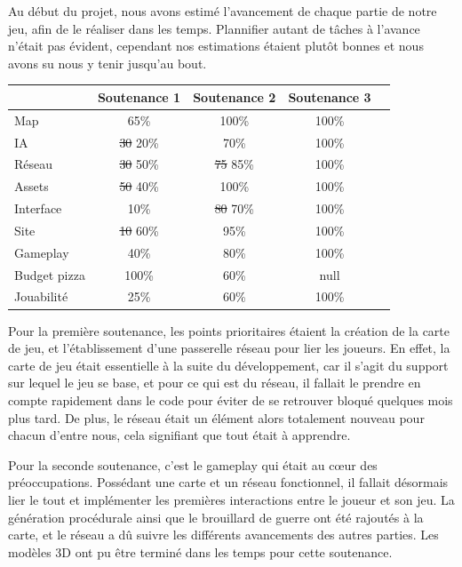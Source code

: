 \documentclass[12pt]{report}
\begin{document}
Au début du projet, nous avons estimé l'avancement de chaque partie de notre
jeu, afin de le réaliser dans les temps. Plannifier autant de tâches à l'avance
n'était pas évident, cependant nos estimations étaient plutôt bonnes et nous
avons su nous y tenir jusqu'au bout.

\vspace{0.5cm}

\begin{center}
    \begin{tabular}{@{} l *4c @{}}
        \toprule
        \multicolumn{1}{c}{}    & \textbf{Soutenance 1}  & \textbf{Soutenance 2}  & \textbf{Soutenance 3} \\ 
        \midrule
        Map & 65\% & 100\% & 100\% \\
        IA & \sout{30} {\color{red} 20}\% & 70\% & 100\% \\
        Réseau & \sout{30} {\color{green} 50}\% & \sout{75} {\color{green} 85}\% & 100\% \\
        Assets & \sout{50} {\color{red} 40}\% & 100\% & 100\% \\
        Interface & 10\% & \sout{80} {\color{red} 70}\% & 100\% \\
        Site & \sout{10} {\color{green} 60}\% & 95\% & 100\% \\
        Gameplay & 40\% & 80\% & 100\% \\
        Budget pizza & 100\% & 60\% & null\\
        \midrule
        Jouabilité & 25\% & 60\% & 100\% \\
        \bottomrule
    \end{tabular}
\end{center}

\vspace{0.5cm}

Pour la première soutenance, les points prioritaires étaient la création de la
carte de jeu, et l'établissement d'une passerelle réseau pour lier les joueurs.
En effet, la carte de jeu était essentielle à la suite du développement, car il
s'agit du support sur lequel le jeu se base, et pour ce qui est du réseau, il
fallait le prendre en compte rapidement dans le code pour éviter de se retrouver
bloqué quelques mois plus tard. De plus, le réseau était un élément alors
totalement nouveau pour chacun d'entre nous, cela signifiant que tout était à
apprendre.

Pour la seconde soutenance, c'est le gameplay qui était au cœur des
préoccupations. Possédant une carte et un réseau fonctionnel, il fallait
désormais lier le tout et implémenter les premières interactions entre le joueur
et son jeu. La génération procédurale ainsi que le brouillard de guerre ont été
rajoutés à la carte, et le réseau a dû suivre les différents avancements des
autres parties. Les modèles 3D ont pu être terminé dans les temps pour cette
soutenance.
\end{document}
